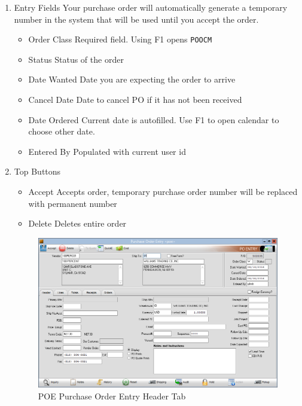 \begin{enumerate}
	\item Entry Fields \textemdash Your purchase order will automatically generate a temporary number in the system that will be used until you accept the order.
	\begin{itemize}
		\item Order Class \textemdash Required field. Using F1 opens \texttt{POOCM}
		\item Status \textemdash Status of the order
		\item Date Wanted \textemdash Date you are expecting the order to arrive
		\item Cancel Date \textemdash Date to cancel PO if it has not been received
		\item Date Ordered \textemdash Current date is autofilled. Use F1 to open calendar to choose other date.
		\item Entered By \textemdash Populated with current user id
	\end{itemize}
	\item Top Buttons
	\begin{itemize}
		\item Accept \textemdash Accepts order, temporary purchase order number will be replaced with permanent number
		\item Delete \textemdash Deletes entire order
	\end{itemize}
	
	\begin{figure}[H]
		\includegraphics[width=\textwidth]{../img/image97}
		\caption{POE Purchase Order Entry Header Tab}
	\end{figure}
	

\end{enumerate}
